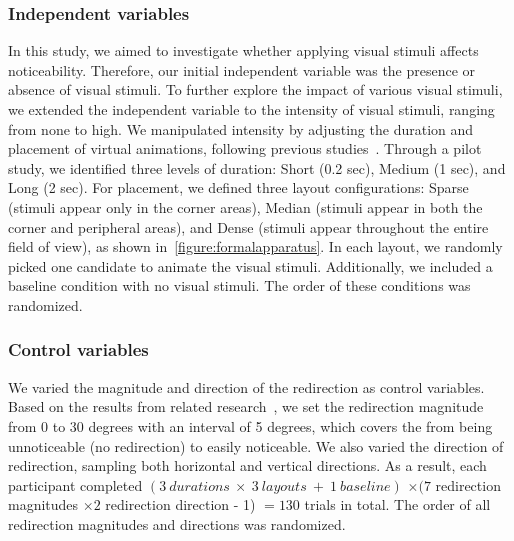 \subsubsection{Independent variables}
In this study, we aimed to investigate whether applying visual stimuli affects noticeability. 
Therefore, our initial independent variable was the presence or absence of visual stimuli. 
To further explore the impact of various visual stimuli, we extended the independent variable to the intensity of visual stimuli, ranging from none to high.
We manipulated intensity by adjusting the duration and placement of virtual animations, following previous studies~\cite{gutwin2017peripheral, li2024predicting}. 
Through a pilot study, we identified three levels of duration: Short (0.2 sec), Medium (1 sec), and Long (2 sec).
For placement, we defined three layout configurations: Sparse (stimuli appear only in the corner areas), Median (stimuli appear in both the corner and peripheral areas), and Dense (stimuli appear throughout the entire field of view), as shown in~\autoref{figure:formalapparatus}.
In each layout, we randomly picked one candidate to animate the visual stimuli.
Additionally, we included a baseline condition with no visual stimuli.
The order of these conditions was randomized.


\subsubsection{Control variables}
We varied the magnitude and direction of the redirection as control variables. 
Based on the results from related research~\cite{li2022modeling}, we set the redirection magnitude from 0 to 30 degrees with an interval of 5 degrees, which covers the from being unnoticeable (no redirection) to easily noticeable.
We also varied the direction of redirection, sampling both horizontal and vertical directions.
As a result, each participant completed $(3~durations~\times~3~layouts~+~1~baseline)$  $\times (7$ redirection magnitudes $\times 2$ redirection direction - 1) $= 130$ trials in total.
The order of all redirection magnitudes and directions was randomized.

